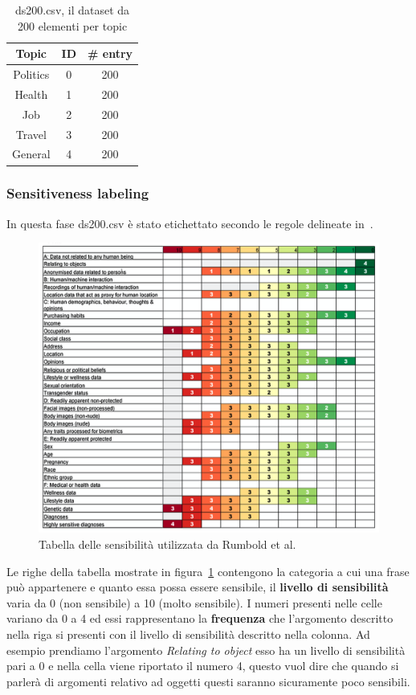 \begin{table}[h!t]
    \centering
    \begin{tabular}{c|c|c}
    \hline
        \textbf{Topic} & \textbf{ID} & \textbf{\# entry} \\ \hline
        Politics & 0 & 200 \\ \hline
        Health & 1 & 200 \\ \hline
        Job & 2 & 200 \\ \hline
        Travel & 3 & 200 \\ \hline
        General & 4 & 200 \\ \hline
    \end{tabular}
    \caption{ds200.csv, il dataset da 200 elementi per topic}
    \label{tab:ds200.csv}
\end{table}
\FloatBarrier

\subsubsection{Sensitiveness labeling}
\label{sssec:sens_labeling}
In questa fase ds200.csv è stato etichettato secondo le regole delineate in~\cite{dataSpectrum}.
\begin{figure}
    \centering
    \includegraphics[scale=0.4]{Figure/sensTbl.png}
    \caption{Tabella delle sensibilità utilizzata da Rumbold et al.~\cite{spectrum}}
    \label{fig:sensRumboldd}
\end{figure}
\FloatBarrier
Le righe della tabella mostrate in figura~\ref{fig:sensRumboldd} contengono la categoria a cui una frase può appartenere e quanto essa possa essere sensibile, il \textbf{livello di sensibilità} varia da 0 (non sensibile) a 10 (molto sensibile). I numeri presenti nelle celle variano da 0 a 4 ed essi rappresentano la \textbf{frequenza} che l'argomento descritto nella riga si presenti con il livello di sensibilità descritto nella colonna. Ad esempio prendiamo l'argomento \textit{Relating to object} esso ha un livello di sensibilità pari a 0 e nella cella viene riportato il numero 4, questo vuol dire che quando si parlerà di argomenti relativo ad oggetti questi saranno sicuramente poco sensibili.


